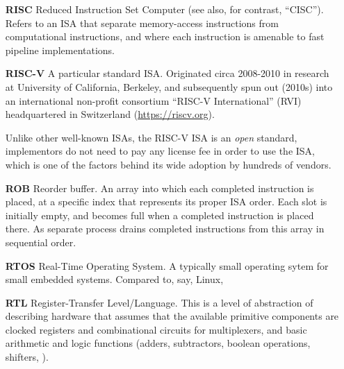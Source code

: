\begin{itemize}
\item[\bf RISC] Reduced Instruction Set Computer (see also, for
  contrast, ``CISC'').  Refers to an ISA that separate memory-access
  instructions from computational instructions, and where each
  instruction is amenable to fast pipeline implementations.

\item[\bf RISC-V] A particular standard ISA.  Originated circa
  2008-2010 in research at University of California, Berkeley, and
  subsequently spun out (2010s) into an international non-profit
  consortium ``RISC-V International'' (RVI) headquartered in
  Switzerland (\url{https://riscv.org}).

  Unlike other well-known ISAs, the RISC-V ISA is an \emph{open}
  standard, {\ie} implementors do not need to pay any license fee in
  order to use the ISA, which is one of the factors behind its wide
  adoption by hundreds of vendors.

\item[\bf ROB] Reorder buffer.  An array into which each completed
  instruction is placed, at a specific index that represents its
  proper ISA order.  Each slot is initially empty, and becomes full
  when a completed instruction is placed there.  As separate process
  drains completed instructions from this array in sequential order.

\item[\bf RTOS] Real-Time Operating System.  A typically small
  operating sytem for small embedded systems.  Compared to, say,
  Linux,

\item[\bf RTL] Register-Transfer Level/Language.  This is a level of
  abstraction of describing hardware that assumes that the available
  primitive components are clocked registers and combinational
  circuits for multiplexers, and basic arithmetic and logic functions
  (adders, subtractors, boolean operations, shifters, {\etc}).


\end{itemize}
